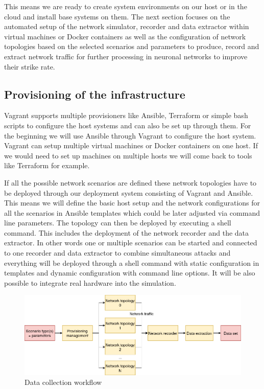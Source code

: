 \documentclass[conference]{IEEEtran}
\begin{document}
This means we are ready to create system environments on our host or in the cloud and install base systems on them. The next section focuses on the automated setup of the network simulator, recorder and data extractor within virtual machines or Docker containers as well as the configuration of network topologies based on the selected scenarios and parameters to produce, record and extract network traffic for further processing in neuronal networks to improve their strike rate.

\subsection{Provisioning of the infrastructure}

Vagrant supports multiple provisioners like Ansible, Terraform or simple bash scripts to configure the host systems and can also be set up through them. For the beginning we will use Ansible through Vagrant to configure the host system. Vagrant can setup multiple virtual machines or Docker containers on one host. If we would need to set up machines on multiple hosts we will come back to tools like Terraform for example. \cite{b9}

If all the possible network scenarios are defined these network topologies have to be deployed through our deployment system consisting of Vagrant and Ansible. This means we will define the basic host setup and the network configurations for all the scenarios in Ansible templates which could be later adjusted via command line parameters. The topology can then be deployed by executing a shell command. This includes the deployment of the network recorder and the data extractor. In other words one or multiple scenarios can be started and connected to one recorder and data extractor to combine simultaneous attacks and everything will be deployed through a shell command with static configuration in templates and dynamic configuration with command line options. It will be also possible to integrate real hardware into the simulation.

\begin{figure}[htbp]
\centerline{\includegraphics[scale=0.28]{design_flow.png}}
\caption{Data collection workflow}
\label{design-flow}
\end{figure}
\end{document}
